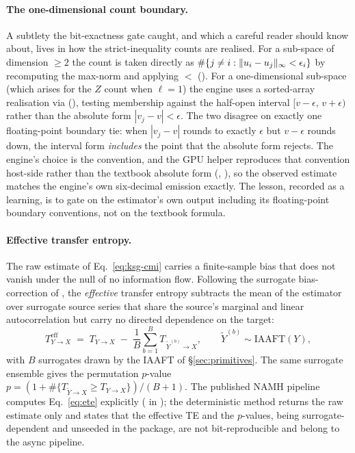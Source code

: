 \paragraph{The one-dimensional count boundary.}
A subtlety the bit-exactness gate caught, and which a careful reader should know about,
lives in how the strict-inequality counts are realised. For a sub-space of dimension
$\ge 2$ the count is taken directly as $\#\{j\neq i : \lVert u_i-u_j \rVert_\infty <
\epsilon_i\}$ by recomputing the max-norm and applying $<$ (). For a
one-dimensional sub-space (which arises for the $Z$ count when $\ell=1$) the engine
uses a sorted-array realisation via 
(), testing membership against the half-open interval
$[v-\epsilon,\, v+\epsilon)$ rather than the absolute form $|v_j-v|<\epsilon$. The two
disagree on exactly one floating-point boundary tie: when $|v_j-v|$ rounds to exactly
$\epsilon$ but $v-\epsilon$ rounds down, the interval form \emph{includes} the point
that the absolute form rejects. The engine's choice is the 
convention, and the GPU helper reproduces that convention host-side rather than the
textbook absolute form (, ),
so the observed estimate matches the engine's own six-decimal emission exactly. The
lesson, recorded as a learning, is to gate on the estimator's own output including its
floating-point boundary conventions, not on the textbook formula.

\paragraph{Effective transfer entropy.}
The raw estimate of Eq.~\eqref{eq:ksg-cmi} carries a finite-sample bias that does not
vanish under the null of no information flow. Following the surrogate bias-correction
of \citet{marschinski2002}, the \emph{effective} transfer entropy subtracts the mean of
the estimator over surrogate source series that share the source's marginal and linear
autocorrelation but carry no directed dependence on the target:
\begin{equation}
\label{eq:ete}
T^{\text{eff}}_{Y\to X}
  \;=\; T_{Y\to X} \;-\; \frac{1}{B}\sum_{b=1}^{B} T_{\,\tilde Y^{(b)}\to X},
\qquad \tilde Y^{(b)} \sim \text{IAAFT}(Y),
\end{equation}
with $B$ surrogates drawn by the IAAFT of \S\ref{sec:primitives}. The same surrogate
ensemble gives the permutation $p$-value $p=(1+\#\{T_{\tilde Y\to X}\ge
T_{Y\to X}\})/(B+1)$. The published NAMH pipeline computes
Eq.~\eqref{eq:ete} explicitly ( in ); the
deterministic  method returns the raw estimate only and states that
the effective TE and the $p$-values, being surrogate-dependent and unseeded in the
package, are not bit-reproducible and belong to the async pipeline.

